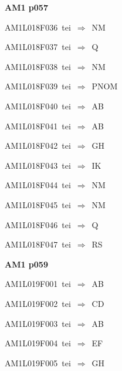 \par\vfill\eject
{\bf\hfill AM1 p057\hfill\hbox{}}\par\bigskip
{\sixrm AM1L018F036\ {\sixit tei}\ }$\Rightarrow$\ NM\par\smallskip
{\sixrm AM1L018F037\ {\sixit tei}\ }$\Rightarrow$\ Q\par\smallskip
{\sixrm AM1L018F038\ {\sixit tei}\ }$\Rightarrow$\ NM\par\smallskip
{\sixrm AM1L018F039\ {\sixit tei}\ }$\Rightarrow$\ PNOM\par\smallskip
{\sixrm AM1L018F040\ {\sixit tei}\ }$\Rightarrow$\ AB\par\smallskip
{\sixrm AM1L018F041\ {\sixit tei}\ }$\Rightarrow$\ AB\par\smallskip
{\sixrm AM1L018F042\ {\sixit tei}\ }$\Rightarrow$\ GH\par\smallskip
{\sixrm AM1L018F043\ {\sixit tei}\ }$\Rightarrow$\ IK\par\smallskip
{\sixrm AM1L018F044\ {\sixit tei}\ }$\Rightarrow$\ NM\par\smallskip
{\sixrm AM1L018F045\ {\sixit tei}\ }$\Rightarrow$\ NM\par\smallskip
{\sixrm AM1L018F046\ {\sixit tei}\ }$\Rightarrow$\ Q\par\smallskip
{\sixrm AM1L018F047\ {\sixit tei}\ }$\Rightarrow$\ RS\par\smallskip

\par\vfill\eject
{\bf\hfill AM1 p059\hfill\hbox{}}\par\bigskip
{\sixrm AM1L019F001\ {\sixit tei}\ }$\Rightarrow$\ AB\par\smallskip
{\sixrm AM1L019F002\ {\sixit tei}\ }$\Rightarrow$\ CD\par\smallskip
{\sixrm AM1L019F003\ {\sixit tei}\ }$\Rightarrow$\ AB\par\smallskip
{\sixrm AM1L019F004\ {\sixit tei}\ }$\Rightarrow$\ EF\par\smallskip
{\sixrm AM1L019F005\ {\sixit tei}\ }$\Rightarrow$\ GH\par\smallskip

